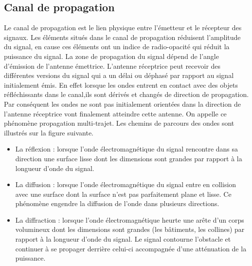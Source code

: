 \subsection{Canal de propagation}

Le canal de propagation est le lien physique entre l'émetteur et le récepteur des signaux.  Les éléments situés dans le canal de propagation réduisent l'amplitude du signal, en cause ces éléments ont un indice de radio-opacité qui réduit la puissance du signal. La zone de propagation du signal dépend de l'angle d'émission de l'antenne émettrice. L'antenne réceptrice peut recevoir des différentes versions du signal qui a un délai ou déphasé par rapport au signal initialement émis. En effet lorsque les ondes entrent en contact avec des objets réfléchissants dans le canal,ils sont dérivés et changés de direction de propagation. Par conséquent les ondes ne sont pas initialement orientées dans la direction de l'antenne réceptrice vont finalement atteindre cette antenne. On appelle ce phénomène propagation multi-trajet. Les chemins de parcours des ondes sont illustrés sur la figure suivante.\\


\begin{itemize}[label=, font=\large \color{lightgray}]
\item La réflexion : lorsque l'onde électromagnétique du signal rencontre dans sa direction une surface lisse dont les dimensions sont grandes par rapport à la longueur d'onde du signal.

\item La diffusion : lorsque l'onde électromagnétique du signal entre en collision avec une surface dont la surface n'est pas parfaitement plane et lisse. Ce phénomène engendre la diffusion de l'onde dans plusieurs directions.

\item La diffraction : lorsque l'onde électromagnétique heurte une arête d'un corps volumineux dont les dimensions sont grandes (les bâtiments, les collines) par rapport à la longueur d'onde  du signal. Le signal contourne l'obstacle et continuer à se propager derrière celui-ci accompagnée d'une atténuation de la puissance.\\
\end{itemize}

